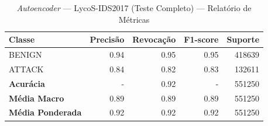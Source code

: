 \begin{table}[H]
    \centering
    \small
    \begin{tabular}{lrrrr}
        \hline
        Classe                   & Precisão & Revocação & F1-score & Suporte \\
        \hline
        BENIGN                   & 0.94     & 0.95      & 0.95     & 418639  \\
        ATTACK                   & 0.84     & 0.82      & 0.83     & 132611  \\
        \hline
        \textbf{Acurácia}        & -        & 0.92      & -        & 551250  \\
        \textbf{Média Macro}     & 0.89     & 0.89      & 0.89     & 551250  \\
        \textbf{Média Ponderada} & 0.92     & 0.92      & 0.92     & 551250  \\
        \hline
    \end{tabular}
    \caption{\textit{Autoencoder} — LycoS-IDS2017 (Teste Completo) — Relatório de Métricas}
    \label{table:ae_lycos_completo_metricas}
\end{table}
